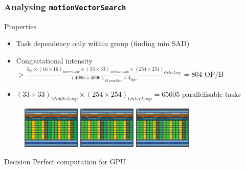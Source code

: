 \begin{frame}
  \frametitle{Analysing \lstinline{motionVectorSearch}}
  \begin{block}{Properties}
    \begin{itemize}
    \item<+-> Task dependency only within group (finding min SAD)
    \item<+-> Computational intensity \(> \frac{3_{op} \times (16 \times 16)_{InnerLoop} \times
        (33 \times 33)_{MiddleLoop} \times (254 \times 254)_{OuterLoop}}{(4096 \times
        4096)_{FrameSize} \times 4_{byte}} = 804\) OP/B
    \item<+-> \((33 \times 33)_{MiddleLoop} \times (254 \times 254)_{OuterLoop} =
      65605\) parallelisable tasks
    \end{itemize}
  \end{block}
  \onslide<+->
  \begin{figure}[h]
    \centering
    \includegraphics[height=2cm]{sm.png}
    \includegraphics[height=2cm]{sm.png}
    \includegraphics[height=2cm]{sm.png}
  \end{figure}
  \onslide<+->
  \begin{alertblock}{Decision}
    Perfect computation for GPU
  \end{alertblock}
\end{frame}

